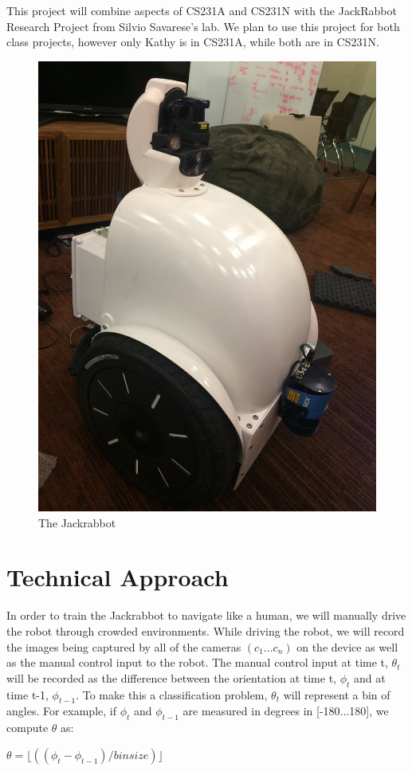 \documentclass[12pt]{article}
\begin{document}
This project will combine aspects of CS231A and CS231N with the JackRabbot Research Project from Silvio Savarese's lab. We plan to use this project for both class projects, however only Kathy is in CS231A, while both are in CS231N.

\begin{figure}[t]
\begin{center}
\includegraphics[scale=0.1]{pics/jackrabbot.jpeg}
\end{center}
   \caption{The Jackrabbot}
\label{fig:long}
\label{fig:onecol}
\end{figure}

\section{Technical Approach}

In order to train the Jackrabbot to navigate like a human, we will manually drive the robot through crowded environments. While driving the robot, we will record the images being captured by all of the cameras $(c_1...c_n)$ on the device as well as the manual control input to the robot. The manual control input at time t, $\theta_t$ will be recorded as the difference between the orientation at time t, $\phi_t$ and at time t-1, $\phi_{t-1}$. To make this a classification problem, $\theta_t$ will represent a bin of angles. For example, if $\phi_t$ and $\phi_{t-1}$ are measured in degrees in [-180...180], we compute $\theta$ as: 
\begin{center} 
$\theta = \lfloor((\phi_t - \phi_{t-1}) / binsize)\rfloor$
\end{center}
\end{document}

